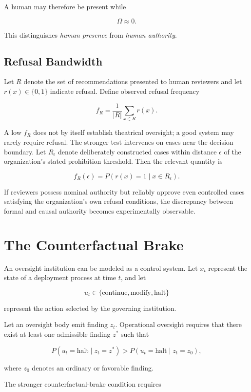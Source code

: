 \documentclass[11pt]{article}
\begin{document}
A human may therefore be present while

\[
\Omega\approx0.
\]

This distinguishes \emph{human presence} from \emph{human authority}.

\subsection{Refusal Bandwidth}

Let \(R\) denote the set of recommendations presented to human reviewers and
let \(r(x)\in\{0,1\}\) indicate refusal. Define observed refusal frequency

\[
f_R
=
\frac{1}{|R|}
\sum_{x\in R}r(x).
\]

A low \(f_R\) does not by itself establish theatrical oversight; a good
system may rarely require refusal. The stronger test intervenes on cases near
the decision boundary. Let \(R_\epsilon\) denote deliberately constructed
cases within distance \(\epsilon\) of the organization's stated prohibition
threshold. Then the relevant quantity is

\[
f_R(\epsilon)
=
P(r(x)=1\mid x\in R_\epsilon).
\]

If reviewers possess nominal authority but reliably approve even controlled
cases satisfying the organization's own refusal conditions, the discrepancy
between formal and causal authority becomes experimentally observable.


\section{The Counterfactual Brake}

An oversight institution can be modeled as a control system. Let \(x_t\)
represent the state of a deployment process at time \(t\), and let

\[
u_t\in\{\text{continue},\text{modify},\text{halt}\}
\]

represent the action selected by the governing institution.

Let an oversight body emit finding \(z_t\). Operational oversight requires
that there exist at least one admissible finding \(z^*\) such that

\[
P(u_t=\text{halt}\mid z_t=z^*)>
P(u_t=\text{halt}\mid z_t=z_0),
\]

where \(z_0\) denotes an ordinary or favorable finding.

The stronger counterfactual-brake condition requires
\end{document}
